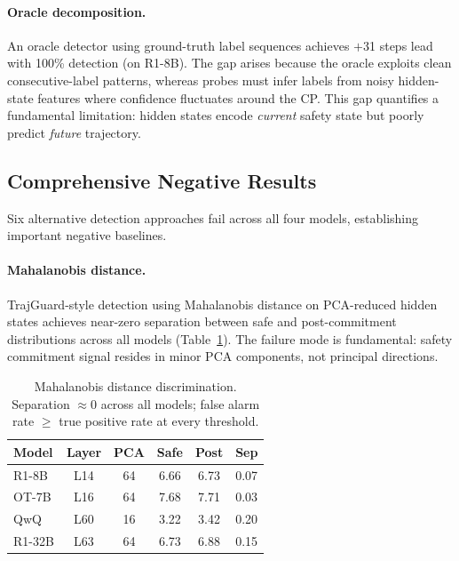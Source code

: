 \documentclass[11pt,a4paper]{article}
\begin{document}
\paragraph{Oracle decomposition.}
An oracle detector using ground-truth label sequences achieves $+$31 steps lead with 100\% detection (on R1-8B).
The gap arises because the oracle exploits clean consecutive-label patterns, whereas probes must infer labels from noisy hidden-state features where confidence fluctuates around the CP.
This gap quantifies a fundamental limitation: hidden states encode \emph{current} safety state but poorly predict \emph{future} trajectory.

\subsection{Comprehensive Negative Results}
\label{sec:negative}

Six alternative detection approaches fail across all four models, establishing important negative baselines.

\paragraph{Mahalanobis distance.}
TrajGuard-style detection using Mahalanobis distance on PCA-reduced hidden states achieves near-zero separation between safe and post-commitment distributions across all models (Table~\ref{tab:mahalanobis}).
The failure mode is fundamental: safety commitment signal resides in minor PCA components, not principal directions.

\begin{table}[t]
\centering
\small
\begin{tabular}{lccccl}
\toprule
\textbf{Model} & \textbf{Layer} & \textbf{PCA} & \textbf{Safe} & \textbf{Post} & \textbf{Sep} \\
\midrule
R1-8B & L14 & 64 & 6.66 & 6.73 & 0.07 \\
OT-7B & L16 & 64 & 7.68 & 7.71 & 0.03 \\
QwQ & L60 & 16 & 3.22 & 3.42 & 0.20 \\
R1-32B & L63 & 64 & 6.73 & 6.88 & 0.15 \\
\bottomrule
\end{tabular}
\caption{Mahalanobis distance discrimination. Separation $\approx 0$ across all models; false alarm rate $\geq$ true positive rate at every threshold.}
\label{tab:mahalanobis}
\end{table}
\end{document}
